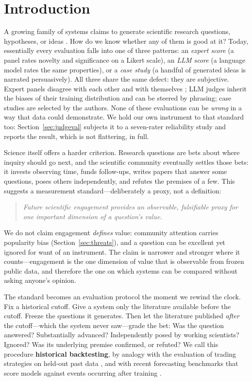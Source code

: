 \section{Introduction}
\label{sec:intro}

A growing family of systems claims to generate scientific research
questions, hypotheses, or ideas
\citep{lu2024aiscientist,wang2024scimon,baek2024researchagent}. How do we
know whether any of them is good at it? Today, essentially every
evaluation falls into one of three patterns: an \emph{expert score} (a
panel rates novelty and significance on a Likert scale), an \emph{LLM
score} (a language model rates the same properties), or a \emph{case
study} (a handful of generated ideas is narrated persuasively). All
three share the same defect: they are subjective. Expert panels disagree
with each other and with themselves \citep{si2024llmideas}; LLM judges
inherit the biases of their training distribution and can be steered by
phrasing; case studies are selected by the authors. None of these
evaluations can be \emph{wrong} in a way that data could demonstrate.
We hold our own instrument to that standard too: Section~\ref{sec:judgeval}
subjects it to a seven-rater reliability study and reports the result,
which is not flattering, in full.

Science itself offers a harder criterion. Research questions are bets
about where inquiry should go next, and the scientific community
eventually settles those bets: it invests observing time, funds
follow-ups, writes papers that answer some questions, poses others
independently, and refutes the premises of a few. This suggests a
measurement standard---deliberately a proxy, not a definition:

\begin{quote}
\emph{Future scientific engagement provides an observable, falsifiable
proxy for one important dimension of a question's value.}
\end{quote}

We do not claim engagement \emph{defines} value: community attention
carries popularity bias (Section~\ref{sec:threats}), and a question can
be excellent yet ignored for want of an instrument. The claim is
narrower and stronger where it counts---engagement is the one dimension
of value that is observable from frozen public data, and therefore the
one on which systems can be compared without asking anyone's opinion.

The standard becomes an evaluation protocol the moment we rewind the
clock. Fix a historical cutoff. Give a system only the literature
available before the cutoff. Freeze the questions it generates. Then let
the literature published \emph{after} the cutoff---which the system
never saw---grade the bet: Was the question answered? Substantially
advanced? Independently posed by working scientists? Ignored? Was its
underlying premise confirmed, or refuted? We call this procedure
\textbf{historical backtesting}, by analogy with the evaluation of
trading strategies on held-out past data \citep{bailey2014backtest}, and
with recent forecasting benchmarks that score models against events
occurring after training \citep{zou2022autocast}.

